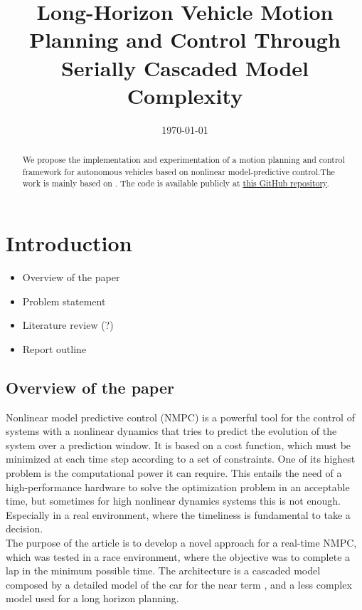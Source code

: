 \documentclass[a4paper, twocolumn, 11pt, twoside]{article}
\title{Long-Horizon Vehicle Motion Planning and Control Through Serially Cascaded Model Complexity}
\author{}
\date{\today}
\begin{document}
\maketitle

\begin{abstract}
    We propose the implementation and experimentation of a motion planning and
    control framework for autonomous vehicles based on nonlinear
    model-predictive control.The work is mainly based on \cite{paper}. The code is available publicly at
    \href{https://github.com/neverorfrog/vehicle-control}{this GitHub
    repository}. 
\end{abstract}


\section{Introduction}

\begin{itemize}
    \item Overview of the paper
    \item Problem statement
    \item Literature review (?)
    \item Report outline
\end{itemize}

\subsection*{Overview of the paper}


Nonlinear model predictive control (NMPC) is a powerful tool for the control of systems with a nonlinear dynamics 
that tries to predict the evolution of the system over a prediction window. It is based on a cost function, which must
be minimized at each time step according to a set of constraints.
One of its highest problem is the computational power it can require. This entails the need of a high-performance hardware
to solve the optimization problem in an acceptable time, but sometimes for high nonlinear dynamics systems this is not enough.
Especially in a real environment, where the timeliness is fundamental to take a decision.\\
The purpose of the article is to develop a novel approach for a real-time NMPC, which was tested in a race environment, where the 
objective was to complete a lap in the minimum possible time. The architecture is a cascaded model composed by a detailed model
of the car for the near term , and a less complex model used for a long horizon planning.
\end{document}
